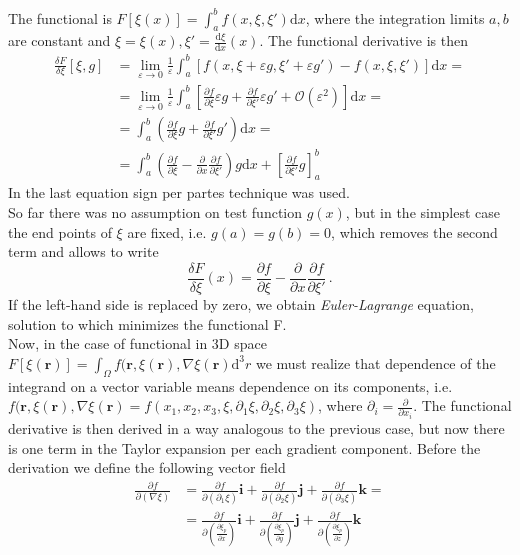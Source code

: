 The functional is $ F[\xi(x)] = \int_a^b f(x, \xi,\xi')\mathrm{d}x $, where the integration limits $a,b$ are constant and $\xi = \xi(x),\xi'=\frac{\mathrm{d}\xi}{\mathrm{d}x}(x)$. The functional derivative is then
\begin{equation}
	\begin{split}
		\frac{\delta F}{\delta \xi}[\xi,g] &= \lim_{\varepsilon\rightarrow0}\frac{1}{\varepsilon}\int_a^b [f(x,\xi+\varepsilon g,\xi'+\varepsilon g')-f(x,\xi,\xi') ]\mathrm{d}x = \\
		&= \lim_{\varepsilon\rightarrow0}\frac{1}{\varepsilon}\int_a^b \left[\frac{\partial f}{\partial \xi}\varepsilon g + \frac{\partial f}{\partial \xi'}\varepsilon g' + \mathcal{O}(\varepsilon^2)\right]\mathrm{d}x = \\
		&= \int_a^b \left(\frac{\partial f}{\partial \xi} g + \frac{\partial f}{\partial \xi'} g' \right)\mathrm{d}x = \\
		&= \int_a^b \left(\frac{\partial f}{\partial \xi} - \frac{\partial}{\partial x}\frac{\partial f}{\partial \xi'} \right)g\mathrm{d}x + \left[\frac{\partial f}{\partial \xi'}g\right]_{a}^b
	\end{split}
\end{equation}
In the last equation sign per partes technique was used. \\
So far there was no assumption on test function $g(x)$, but in the simplest case the end points of $\xi$ are fixed, i.e. $g(a)=g(b)=0$, which removes the second term and allows to write 
\begin{equation}
	\frac{\delta F}{\delta \xi}(x) = \frac{\partial f}{\partial \xi} - \frac{\partial}{\partial x}\frac{\partial f}{\partial \xi'} \,.
\end{equation}
If the left-hand side is replaced by zero, we obtain \textit{Euler-Lagrange} equation, solution to which minimizes the functional F. \\
Now, in the case of functional in 3D space $ F[\xi(\bm{r})] = \int_\Omega f(\bm{r}, \xi(\bm{r}),\nabla\xi(\bm{r})\mathrm{d}^3r $ we must realize that dependence of the integrand on a vector variable means dependence on its components, i.e. $f(\bm{r}, \xi(\bm{r}),\nabla\xi(\bm{r})=f(x_1,x_2,x_3,\xi,\partial_1\xi,\partial_2\xi,\partial_3\xi)$, where $\partial_i = \frac{\partial}{\partial x_i}$. The functional derivative is then derived in a way analogous to the previous case, but now there is one term in the Taylor expansion per each gradient component. Before the derivation we define the following vector field
\begin{equation}
	\begin{split}
		\frac{\partial f}{\partial(\nabla \xi)} &= \frac{\partial f}{\partial(\partial_1\xi)}\mathbf{i} + \frac{\partial f}{\partial(\partial_2\xi)}\mathbf{j} +\frac{\partial f}{\partial(\partial_3\xi)}\mathbf{k} = \\
		&= \frac{\partial f}{\partial(\frac{\partial \xi_p}{\partial x})}\mathbf{i} + \frac{\partial f}{\partial(\frac{\partial \xi_p}{\partial y})}\mathbf{j} +\frac{\partial f}{\partial(\frac{\partial \xi_p}{\partial z})}\mathbf{k}
	\end{split}
\end{equation}
